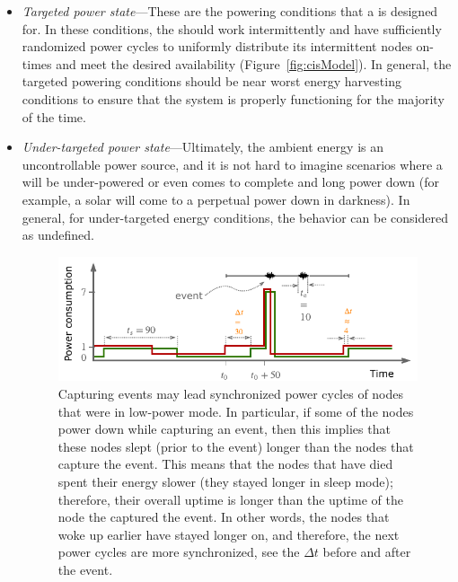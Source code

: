 \begin{itemize}[leftmargin=*]
	\item \textit{Targeted power state}---These are the powering conditions that a \cis is designed for. In these  conditions, the \cis should work intermittently and have sufficiently randomized power cycles to uniformly distribute its intermittent nodes on-times and meet the desired availability (Figure~\ref{fig:cisModel}). In general, the targeted powering conditions should be near worst energy harvesting conditions to ensure that the system is properly functioning for the majority of the time.
	\item \textit{Under-targeted power state}---Ultimately, the ambient energy is an uncontrollable power source, and it is not hard to imagine scenarios where a \cis will be under-powered or even comes to complete and long power down (for example, a solar \cis will come to a perpetual power down in darkness). In general, for under-targeted energy conditions, the \cis behavior can be considered as undefined.
%
\begin{figure}
	\centering
	\includegraphics[width=\columnwidth]{figures/hibernatingState}
	\caption{
	Capturing events may lead synchronized power cycles of nodes that were
	in low-power mode. In particular, if some of the nodes power down while
	capturing an event, then this implies that these nodes slept (prior to
	the event) longer than the nodes that capture the event. This means
	that the nodes that have died spent their energy slower (they stayed
	longer in sleep mode); therefore,  their overall uptime is longer than
	the uptime of the node the captured the event. In other words, the
	nodes that woke up earlier have stayed longer on, and therefore, the
	next power cycles are more synchronized, see the $\Delta t$ before and after the event.
}
\end{figure}
\end{itemize}

